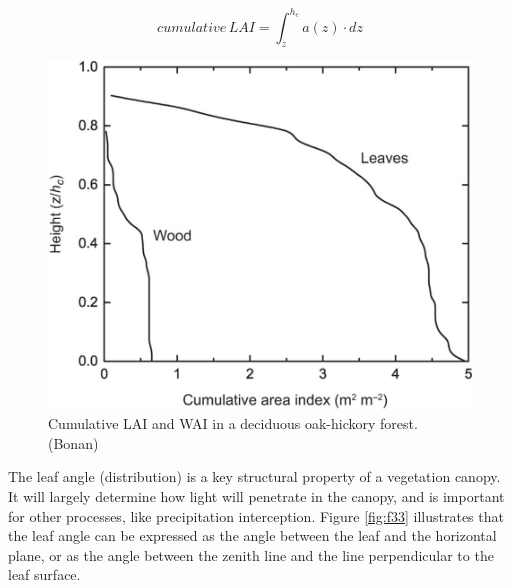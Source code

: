\documentclass[12pt,oneside]{book}
\begin{document}
\[
cumulative \, LAI = \int_z^{h_c}a(z) \cdot dz
\]

\begin{figure}

{\centering \includegraphics[width=0.8\linewidth]{figures/chap3/f32_cLAI} 

}

\caption{Cumulative LAI and WAI in a deciduous oak-hickory forest. (Bonan)}\label{fig:f32}
\end{figure}

The leaf angle (distribution) is a key structural property of a
vegetation canopy. It will largely determine how light will penetrate in
the canopy, and is important for other processes, like precipitation
interception. Figure \ref{fig:f33} illustrates that the leaf angle can
be expressed as the angle between the leaf and the horizontal plane, or
as the angle between the zenith line and the line perpendicular to the
leaf surface.
\end{document}
